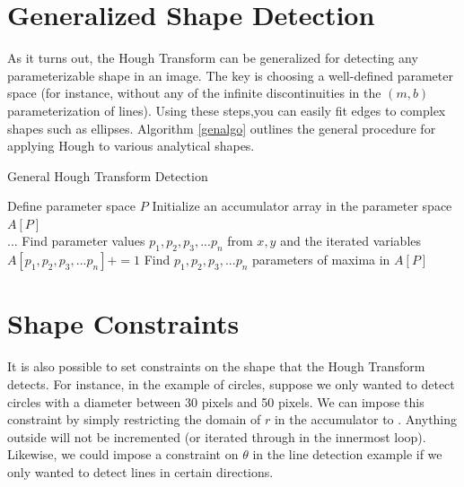 \documentclass{article}
\begin{document}
\section{Generalized Shape Detection}
As it turns out, the Hough Transform can be generalized for detecting any parameterizable shape in an image. The key is choosing a well-defined parameter space (for instance, without any of the infinite discontinuities in the \begin{math}(m,b)\end{math} parameterization of lines). Using these steps,you can easily fit edges to complex shapes such as ellipses. Algorithm \ref{genalgo} outlines the general procedure for applying Hough to various analytical shapes.

\begin{algorithm}
\caption{General Hough Transform Detection}
\label{genalgo}
\begin{algorithmic}
        \State Define parameter space $P$
        \State Initialize an accumulator array in the parameter space $A[P]$
                 \\
                    \State ...
                    \State Find parameter values ${p_1, p_2, p_3,... p_n}$ from $x,y$ and the iterated variables
                    \State $A[p_1, p_2, p_3,... p_n] += 1$
                \EndFor
            \EndFor
        \EndFor
        \State Find $p_1, p_2, p_3,... p_n$ parameters of maxima in $A[P]$
\EndFunction
\end{algorithmic}
\end{algorithm}

\section{Shape Constraints}
It is also possible to set constraints on the shape that the Hough Transform detects. For instance, in the example of circles, suppose we only wanted to detect circles with a diameter between 30 pixels and 50 pixels. We can impose this constraint by simply restricting the domain of \begin{math}r\end{math} in the accumulator to \begin{math}[30, 50]\end{math}. Anything outside will not be incremented (or iterated through in the innermost loop). Likewise, we could impose a constraint on \begin{math}\theta\end{math} in the line detection example if we only wanted to detect lines in certain directions. 
\end{document}
